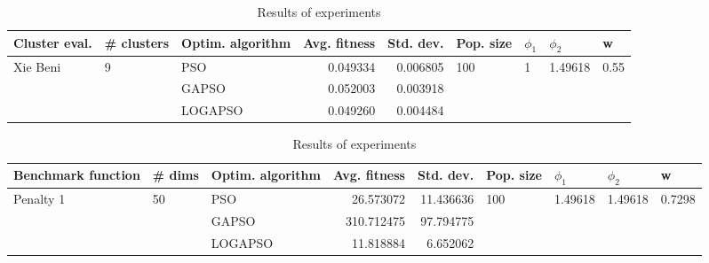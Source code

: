 \documentclass{article}
\begin{document}
\begin{table}
\centering
\caption{Results of experiments}
\begin{tabular}{lllrrllll}
\toprule
            Cluster eval. &        \# clusters & Optim. algorithm &  Avg. fitness &  Std. dev. &            Pop. size &         $\phi_{1}$ &               $\phi_{2}$ &                     w \\
\midrule
\multirow{3}{*}{Xie Beni} & \multirow{3}{*}{9} &              PSO &      0.049334 &   0.006805 & \multirow{3}{*}{100} & \multirow{3}{*}{1} & \multirow{3}{*}{1.49618} & \multirow{3}{*}{0.55} \\
                          &                    &            GAPSO &      0.052003 &   0.003918 &                      &                    &                          &                       \\
                          &                    &          LOGAPSO &      0.049260 &   0.004484 &                      &                    &                          &                       \\
\bottomrule
\end{tabular}
\end{table}
\begin{table}
\centering
\caption{Results of experiments}
\begin{tabular}{lllrrllll}
\toprule
        Benchmark function &             \# dims & Optim. algorithm &  Avg. fitness &  Std. dev. &            Pop. size &               $\phi_{1}$ &               $\phi_{2}$ &                       w \\
\midrule
\multirow{3}{*}{Penalty 1} & \multirow{3}{*}{50} &              PSO &     26.573072 &  11.436636 & \multirow{3}{*}{100} & \multirow{3}{*}{1.49618} & \multirow{3}{*}{1.49618} & \multirow{3}{*}{0.7298} \\
                           &                     &            GAPSO &    310.712475 &  97.794775 &                      &                          &                          &                         \\
                           &                     &          LOGAPSO &     11.818884 &   6.652062 &                      &                          &                          &                         \\
\bottomrule
\end{tabular}
\end{table}
\end{document}
